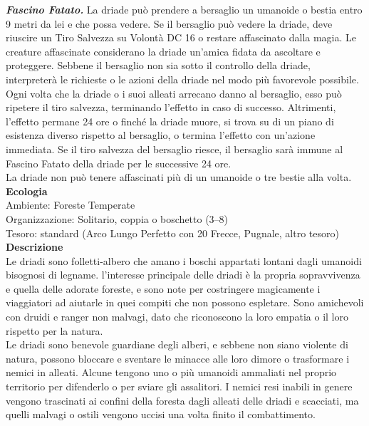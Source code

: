 \begin{multicols}{2}
\emph{\textbf{Fascino Fatato.}} La driade può prendere a bersaglio un umanoide o bestia entro 9 metri da lei e che possa vedere. Se il bersaglio può vedere la driade, deve riuscire un Tiro Salvezza su Volontà DC  16 o restare affascinato dalla magia. Le creature affascinate considerano la driade un'amica fidata da ascoltare e proteggere. Sebbene il bersaglio non sia sotto il controllo della driade, interpreterà le richieste o le azioni della driade nel modo più favorevole possibile.\\
Ogni volta che la driade o i suoi alleati arrecano danno al bersaglio, esso può ripetere il tiro salvezza, terminando l'effetto in caso di successo. Altrimenti, l'effetto permane 24 ore o finché la driade muore, si trova su di un piano di esistenza diverso rispetto al bersaglio, o termina l'effetto con un'azione immediata. Se il tiro salvezza del bersaglio riesce, il bersaglio sarà immune al Fascino Fatato della driade per le successive 24 ore.\\
La driade non può tenere affascinati più di un umanoide o tre bestie alla volta.\\
\textbf{Ecologia}\\
Ambiente: Foreste Temperate\\
Organizzazione: Solitario, coppia o boschetto (3–8)\\
Tesoro: standard (Arco Lungo Perfetto con 20 Frecce, Pugnale, altro tesoro)\\
\textbf{Descrizione}\\
Le driadi sono folletti-albero che amano i boschi appartati lontani dagli umanoidi bisognosi di legname. l'interesse principale delle driadi è la propria sopravvivenza e quella delle adorate foreste, e sono note per costringere magicamente i viaggiatori ad aiutarle in quei compiti che non possono espletare. Sono amichevoli con druidi e ranger non malvagi, dato che riconoscono la loro empatia o il loro rispetto per la natura.\\
Le driadi sono benevole guardiane degli alberi, e sebbene non siano violente di natura, possono bloccare e sventare le minacce alle loro dimore o trasformare i nemici in alleati. Alcune tengono uno o più umanoidi ammaliati nel proprio territorio per difenderlo o per sviare gli assalitori. I nemici resi inabili in genere vengono trascinati ai confini della foresta dagli alleati delle driadi e scacciati, ma quelli malvagi o ostili vengono uccisi una volta finito il combattimento.\\


\end{multicols}
